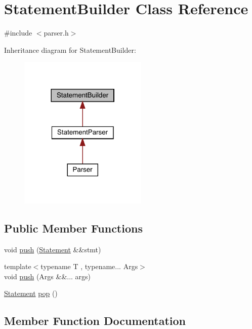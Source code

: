 \hypertarget{class_statement_builder}{}\section{Statement\+Builder Class Reference}
\label{class_statement_builder}


{\ttfamily \#include $<$parser.\+h$>$}



Inheritance diagram for Statement\+Builder\+:\nopagebreak
\begin{figure}[H]
\begin{center}
\leavevmode
\includegraphics[width=173pt]{class_statement_builder__inherit__graph}
\end{center}
\end{figure}
\subsection*{Public Member Functions}
\begin{DoxyCompactItemize}
\item 
void \hyperlink{class_statement_builder_abeed5dfee736817de06d468b5ae9da42}{push} (\hyperlink{ast_8h_a8b6ddf3732a0acd77e6b2509fb21a5fd}{Statement} \&\&stmt)
\item 
{\footnotesize template$<$typename T , typename... Args$>$ }\\void \hyperlink{class_statement_builder_a54afe55d6ae2e0b12a4673b285bf758d}{push} (Args \&\&... args)
\item 
\hyperlink{ast_8h_a8b6ddf3732a0acd77e6b2509fb21a5fd}{Statement} \hyperlink{class_statement_builder_a5061075f55cb135a5ed2830d18fcf786}{pop} ()
\end{DoxyCompactItemize}


\subsection{Member Function Documentation}
\mbox{\label{class_statement_builder_a5061075f55cb135a5ed2830d18fcf786}} 
